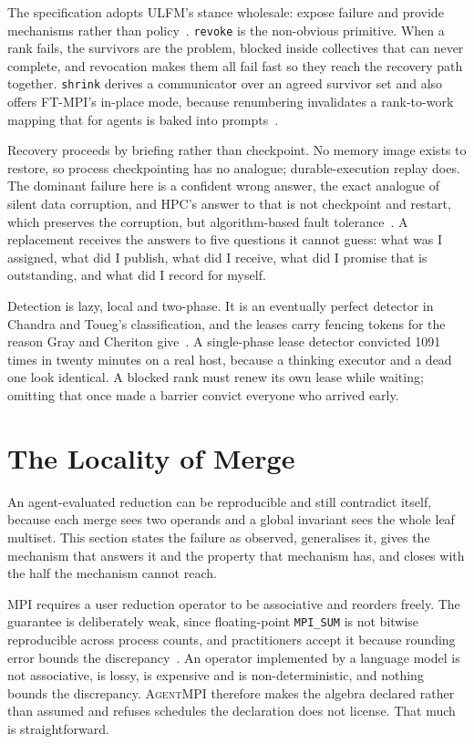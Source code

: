 \documentclass[sigconf,nonacm]{acmart}
\newcommand{\ampi}{\textsc{AgentMPI}\xspace}
\newcommand{\code}[1]{\texttt{\small #1}}
\begin{document}
The specification adopts ULFM's stance wholesale: expose failure and provide
mechanisms rather than policy~\cite{bland2012ulfm,bland2013ulfm}. \code{revoke}
is the non-obvious primitive. When a rank fails, the survivors are the problem,
blocked inside collectives that can never complete, and revocation makes them
all fail fast so they reach the recovery path together. \code{shrink} derives a
communicator over an agreed survivor set and also offers FT-MPI's in-place mode,
because renumbering invalidates a rank-to-work mapping that for agents is baked
into prompts~\cite{fagg2000ftmpi}.

Recovery proceeds by briefing rather than checkpoint. No memory image exists to
restore, so process checkpointing has no analogue; durable-execution replay does.
The dominant failure here is a confident wrong answer, the exact analogue of
silent data corruption, and HPC's answer to that is not checkpoint and restart,
which preserves the corruption, but algorithm-based fault
tolerance~\cite{huang1984abft,bosilca2009abft}. A replacement receives the
answers to five questions it cannot guess: what was I assigned, what did I
publish, what did I receive, what did I promise that is outstanding, and what did
I record for myself.

Detection is lazy, local and two-phase. It is an eventually perfect detector in
Chandra and Toueg's classification, and the leases carry fencing tokens for the
reason Gray and Cheriton give~\cite{chandra1996faildetectors,gray1989leases}. A
single-phase lease detector convicted 1091 times in twenty minutes on a real
host, because a thinking executor and a dead one look identical. A blocked rank
must renew its own lease while waiting; omitting that once made a barrier convict
everyone who arrived early.

\section{The Locality of Merge}
\label{sec:merge}

An agent-evaluated reduction can be reproducible and still contradict itself,
because each merge sees two operands and a global invariant sees the whole leaf
multiset. This section states the failure as observed, generalises it, gives the
mechanism that answers it and the property that mechanism has, and closes with
the half the mechanism cannot reach.

MPI requires a user reduction operator to be associative and reorders freely. The
guarantee is deliberately weak, since floating-point \code{MPI\_SUM} is not
bitwise reproducible across process counts, and practitioners accept it because
rounding error bounds the discrepancy~\cite{ahrens2020reproducible}. An operator
implemented by a language model is not associative, is lossy, is expensive and is
non-deterministic, and nothing bounds the discrepancy. \ampi therefore makes the
algebra declared rather than assumed and refuses schedules the declaration does
not license. That much is straightforward.
\end{document}
